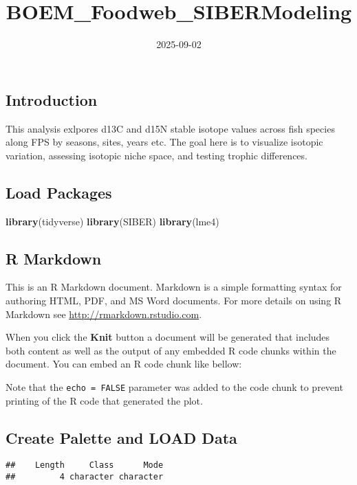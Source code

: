 \documentclass[
]{article}
\title{BOEM\_Foodweb\_SIBERModeling}
\author{}
\date{\vspace{-2.5em}2025-09-02}
\newenvironment{Shaded}{\begin{snugshade}}{\end{snugshade}}
\newcommand{\FunctionTok}[1]{\textcolor[rgb]{0.13,0.29,0.53}{\textbf{#1}}}
\newcommand{\NormalTok}[1]{#1}
\begin{document}
\maketitle

\subsection{Introduction}\label{introduction}

This analysis exlpores d13C and d15N stable isotope values across fish
species along FPS by seasons, sites, years etc. The goal here is to
visualize isotopic variation, assessing isotopic niche space, and
testing trophic differences.

\subsection{Load Packages}\label{load-packages}

\begin{Shaded}
\begin{Highlighting}[]
\FunctionTok{library}\NormalTok{(tidyverse)}
\FunctionTok{library}\NormalTok{(SIBER)}
\FunctionTok{library}\NormalTok{(lme4)}
\end{Highlighting}
\end{Shaded}

\subsection{R Markdown}\label{r-markdown}

This is an R Markdown document. Markdown is a simple formatting syntax
for authoring HTML, PDF, and MS Word documents. For more details on
using R Markdown see \url{http://rmarkdown.rstudio.com}.

When you click the \textbf{Knit} button a document will be generated
that includes both content as well as the output of any embedded R code
chunks within the document. You can embed an R code chunk like bellow:

Note that the \texttt{echo\ =\ FALSE} parameter was added to the code
chunk to prevent printing of the R code that generated the plot.

\subsection{Create Palette and LOAD
Data}\label{create-palette-and-load-data}

\begin{verbatim}
##    Length     Class      Mode 
##         4 character character
\end{verbatim}
\end{document}
